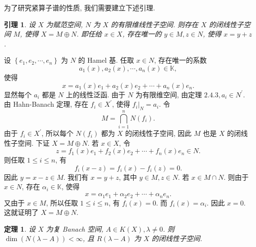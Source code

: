\documentclass[openany]{ctexbook}
\makeatletter
\theoremstyle{kaiti}
\newtheorem{theorem}{定理}[section]
\newtheorem{lemma}{引理}[section]
\theoremstyle{normal}
\renewenvironment{proof}[1][\proofname]{\par
    \pushQED{\qed}%
    \normalfont \topsep6\p@\@plus6\p@\relax
    \trivlist
    \item\relax
    {\heiti #1}\hspace{2\labelsep}\ignorespaces
  }{%
    \popQED\endtrivlist\@endpefalse
  }
\makeatother
\begin{document}
为了研究紧算子谱的性质, 我们需要建立下述引理.

\begin{lemma}
设 $X$ 为赋范空间, $N$ 为 $X$ 的有限维线性子空间. 则存在 $X$ 的闭线性子空间 $M$, 使得 $X=M \oplus N$. 即任给 $x \in X$, 存在唯一的 $y \in M, z \in N$, 使得 $x=y+z$.
\end{lemma}

\begin{proof}
设 $\left\{e_1, e_2, \cdots, e_n\right\}$ 为 $N$ 的 Hamel 基. 任取 $x \in N$, 存在唯一的系数
$$
a_1(x), a_2(x), \cdots, a_n(x) \in \mathbb{K},
$$
使得
$$
x=a_1(x) e_1+a_2(x) e_2+\cdots+a_n(x) e_n.
$$
显然每个 $a_{i}$ 都是 $N$ 上的线性泛函. 由于 $N$ 为有限维空间, 由定理 $2.4.3, a_{i} \in N^{\prime}$. 由 Hahn-Banach 定理, 存在 $f_{i} \in X^{\prime}$, 使得 $\left.f_{i}\right|_{N}=a_{i}$. 令
$$
M=\bigcap_{i=1}^n N\left(f_{i}\right).
$$
由于 $f_{i} \in X^{\prime}$, 所以每个 $N\left(f_{i}\right)$ 都为 $X$ 的闭线性子空间, 因此 $M$ 也是 $X$ 的闭线性子空间. 下证 $X=M \oplus N$.
若 $x \in X$, 令
$$
z=f_1(x) e_1+f_2(x) e_2+\cdots+f_n(x) e_n \in N.
$$
则任取 $1 \leqslant i \leqslant n$, 有
$$
f_{i}(x-z)=f_{i}(x)-f_{i}(z)=0.
$$
因此 $y=x-z \in M$. 我们有 $x=y+z$, 其中 $y \in M, z \in N$. 若 $x \in M \cap N$. 则由于 $x \in N$, 存在 $\alpha_{i} \in \mathbb{K}$, 使得
$$
x=\alpha_1 e_1+\alpha_2 e_2+\cdots+\alpha_n e_n.
$$
又由于 $x \in M$, 所以任取 $1 \leqslant i \leqslant n$, 有 $f_{i}(x)=0$. 而 $f_{i}(x)=\alpha_{i}$. 因此 $x=0$. 这就证明了 $X=M \oplus N$.
\end{proof}

\begin{theorem}
设 $X$ 为复 Banach 空间, $A \in K(X), \lambda \neq 0$. 则 $\operatorname{dim}(N(\lambda-A))<\infty$, 且 $R(\lambda-A)$ 为 $X$ 的闭线性子空间.
\end{theorem}
\end{document}
